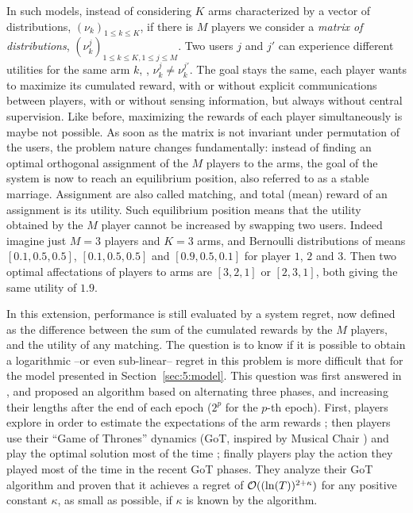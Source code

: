 In such models, instead of considering $K$ arms characterized by a vector of distributions, $(\nu_k)_{1\leq k \leq K}$, if there is $M$ players we consider a \emph{matrix of distributions}, $(\nu_k^j)_{1 \leq k \leq K, 1 \leq j \leq M}$. Two users $j$ and $j'$ can experience different utilities for the same arm $k$, \ie, $\nu_k^{j} \neq \nu_k^{j'}$.
The goal stays the same, each player wants to maximize its cumulated reward, with or without explicit communications between players, with or without sensing information, but always without central supervision.
%
Like before, maximizing the rewards of each player simultaneously is maybe not possible.
As soon as the matrix is not invariant under permutation of the users, the problem nature changes fundamentally:
instead of finding an optimal orthogonal assignment of the $M$ players to the \Mbest{} arms,
the goal of the system is now to reach an equilibrium position, also referred to as a stable marriage.
Assignment are also called matching, and total (mean) reward of an assignment is its utility.
Such equilibrium position means that the utility obtained by the $M$ player cannot be increased by swapping two users.
Indeed imagine just $M=3$ players and $K=3$ arms, and Bernoulli distributions of means $[0.1, 0.5, 0.5]$, $[0.1, 0.5, 0.5]$ and $[0.9, 0.5, 0.1]$ for player $1$, $2$ and $3$. Then two optimal affectations of players to arms are $[3,2,1]$ or $[2,3,1]$, both giving the same utility of $1.9$.

In this extension, performance is still evaluated by a system regret, now defined as the difference between the sum of the cumulated rewards by the $M$ players, and the utility of any matching.
The question is to know if it is possible to obtain a logarithmic --or even sub-linear-- regret in this problem is more difficult that for the model presented in Section~\ref{sec:5:model}.
This question was first answered in \cite{Bistritz18}, and proposed an algorithm based on alternating three phases, and increasing their lengths after the end of each epoch ($2^p$ for the $p$-th epoch).
First, players explore in order to estimate the expectations of the arm rewards ; then players use their ``Game of Thrones'' dynamics (GoT, inspired by Musical Chair \cite{Rosenski16}) and play the optimal solution most of the time ; finally players play the action they played most of the time in the recent GoT phases.
They analyze their GoT algorithm and proven that it achieves a regret of $\mathcal{O}((\ln(T))^{2+\kappa})$ for any positive constant $\kappa$, as small as possible, if $\kappa$ is known by the algorithm.


